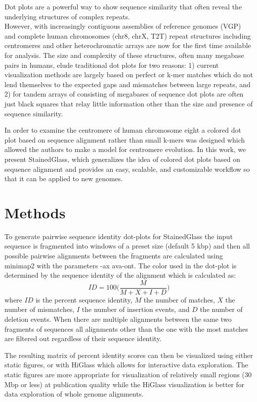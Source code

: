 \documentclass{bioinfo}
\begin{document}
Dot plots are a powerful way to show sequence similarity that often reveal the
underlying structures of complex repeats. 
\\
However, with increasingly contiguous assemblies of reference genomes (VGP) and
complete human chromosomes (chr8, chrX, T2T) repeat structures including
centromeres and other heterochromatic arrays are now for the first time
available for analysis. The size and complexity of these structures, often many
megabase pairs in humans, elude traditional dot plots for two reasons: 1)
current visualization methods are largely based on perfect or k-mer matches
which do not lend themselves to the expected gaps and mismatches between large
repeats, and 2) for tandem arrays of consisting of megabases of sequence dot
plots are often just black squares that relay little information other than the
size and presence of sequence similarity. 

In order to examine the centromere of human chromosome eight a colored dot plot based on
sequence alignment rather than small k-mers was designed which allowed the
authors to make a model for centromere evolution. In this work, we present StainedGlass, which generalizes the idea of colored dot
plots based on sequence alignment and provides an easy, scalable, and
customizable workflow so that it can be applied to new genomes. 

\section{Methods}
To generate pairwise sequence identity dot-plots for StainedGlass the input 
sequence is fragmented into windows of a preset size (default 5 kbp) and then 
all possible pairwise alignments between the fragments are calculated using
minimap2 with the parameters -ax ava-ont. The color used in the dot-plot is
determined by the sequence identity of the alignment which is calculated as:
$$ ID = 100 \biggl( \frac{M}{M+X+I+D} \biggr) $$
where $ID$ is the percent sequence identity, $M$ the number of matches,
$X$ the number of mismatches, $I$ the number of insertion events, and $D$ 
the number of deletion events. When there are multiple alignments between the same two fragments of sequences
all alignments other than the one with the most matches are filtered out
regardless of their sequence identity.

The resulting matrix of percent identity scores can then be visualized using either static figures, or with HiGlass which allows for interactive data exploration. The static figures are more appropriate for visualization of 
relatively small regions (30 Mbp or less) at publication quality while the
HiGlass visualization is better for data exploration of whole genome alignments.
\end{document}
